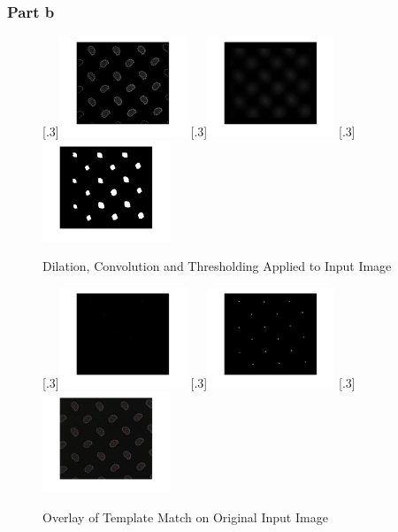 \documentclass[a4paper]{article}
\begin{document}
	\subsubsection{Part b}
	\begin{figure}[H]
		\centering
		[.3\linewidth]{\includegraphics[height=3cm]{Results/Q3/b/qbDilation.jpg}}%
		[.3\linewidth]{\includegraphics[height=3cm]{Results/Q3/b/qbConvolution.jpg}}%
		[.3\linewidth]{\includegraphics[height=3cm]{Results/Q3/b/qbThreshold.jpg}}%
		\caption{Dilation, Convolution and Thresholding Applied to Input
		Image}
		\label{fig:}
	\end{figure}
	\begin{figure}[H]
		\centering
		[.3\linewidth]{\includegraphics[height=3cm]{Results/Q3/b/qbCentroid.jpg}}%
		[.3\linewidth]{\includegraphics[height=3cm]{Results/Q3/b/qbP2S.jpg}}%
		[.3\linewidth]{\includegraphics[height=3cm]{Results/Q3/b/qbOverlay.jpg}}%
		\caption{Overlay of Template Match on Original Input Image}
		\label{fig:}
	\end{figure}
\end{document}
